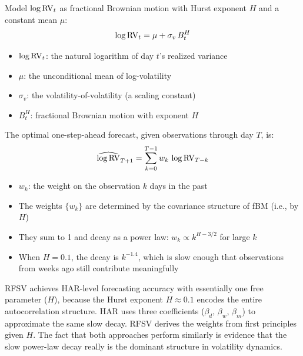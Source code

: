 \begin{definition}
\label{def:rfsv}
Model $\log \operatorname{RV}_t$ as fractional Brownian motion with Hurst exponent $H$ and a constant mean $\mu$:
\begin{equation}
  \log \operatorname{RV}_t = \mu + \sigma_v \, B^H_t
  \label{eq:rfsv-model}
\end{equation}
\begin{itemize}[nosep]
  \item $\log \operatorname{RV}_t$: the natural logarithm of day $t$'s realized variance
  \item $\mu$: the unconditional mean of log-volatility
  \item $\sigma_v$: the volatility-of-volatility (a scaling constant)
  \item $B^H_t$: fractional Brownian motion with exponent $H$
\end{itemize}
The optimal one-step-ahead forecast, given observations through day $T$, is:
\begin{equation}
  \widehat{\log \operatorname{RV}}_{T+1} = \sum_{k=0}^{T-1} w_k \, \log \operatorname{RV}_{T-k}
  \label{eq:rfsv-forecast}
\end{equation}
\begin{itemize}[nosep]
  \item $w_k$: the weight on the observation $k$ days in the past
  \item The weights $\{w_k\}$ are determined by the covariance structure of fBM (i.e., by $H$)
  \item They sum to 1 and decay as a power law: $w_k \propto k^{H - 3/2}$ for large $k$
  \item When $H = 0.1$, the decay is $k^{-1.4}$, which is slow enough that observations from weeks ago still contribute meaningfully
\end{itemize}
\end{definition}

\begin{keyidea}
RFSV achieves HAR-level forecasting accuracy with essentially one free parameter ($H$), because the Hurst exponent $H \approx 0.1$ encodes the entire autocorrelation structure.
HAR uses three coefficients ($\beta_d$, $\beta_w$, $\beta_m$) to approximate the same slow decay.
RFSV derives the weights from first principles given $H$.
The fact that both approaches perform similarly is evidence that the slow power-law decay really is the dominant structure in volatility dynamics.
\end{keyidea}

